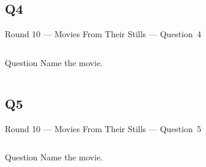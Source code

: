 \documentclass[11pt]{beamer}
\begin{document}
\subsection*{Q4}
\begin{frame}[t]{Round 10 --- Movies From Their Stills --- \mbox{Question 4}}
    \vspace{-0.5em}
    \begin{columns}[T,totalwidth=\linewidth]
        \begin{column}{0.32\linewidth}
            \begin{block}{Question}
                Name the movie.
            \end{block}
        \end{column}
        \begin{column}{0.65\linewidth}
            \begin{center}
                \texttt{[image: \{Images/bhc]}.jpg}
            \end{center}
        \end{column}
    \end{columns}
\end{frame}
\subsection*{Q5}
\begin{frame}[t]{Round 10 --- Movies From Their Stills --- \mbox{Question 5}}
    \vspace{-0.5em}
    \begin{columns}[T,totalwidth=\linewidth]
        \begin{column}{0.32\linewidth}
            \begin{block}{Question}
                Name the movie.
            \end{block}
        \end{column}
        \begin{column}{0.65\linewidth}
            \begin{center}
                \texttt{[image: \{Images/taxidriver]}.jpg}
            \end{center}
        \end{column}
    \end{columns}
\end{frame}
\end{document}
